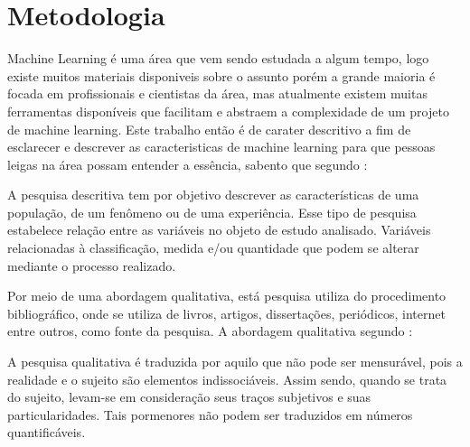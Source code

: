 \chapter{Metodologia}
\label{chap:metodologia}

Machine Learning é uma área que vem sendo estudada a algum tempo, logo existe muitos materiais disponiveis sobre o assunto
porém a grande maioria é focada em profissionais e cientistas da área, mas atualmente existem muitas ferramentas disponíveis
que facilitam e abstraem a complexidade de um projeto de machine learning. Este trabalho então é de carater descritivo a fim de esclarecer 
e descrever as caracteristicas de machine learning para que pessoas leigas na área possam entender a essência,     
sabento que segundo \cite{descritiva}:

\begin{citacao} 
 A pesquisa descritiva tem por objetivo descrever as características de uma população, de um fenômeno ou de uma experiência. 
 Esse tipo de pesquisa estabelece relação entre as variáveis no objeto de estudo analisado. 
 Variáveis relacionadas à classificação, medida e/ou quantidade que podem se alterar mediante o processo realizado.  
\end{citacao} 


Por meio de uma abordagem qualitativa, está pesquisa utiliza do procedimento bibliográfico, onde se utiliza de livros, 
artigos, dissertações, periódicos, internet entre outros, como fonte da pesquisa. A abordagem qualitativa segundo \cite{qualitativa} :

\begin{citacao}
A pesquisa qualitativa é traduzida por aquilo que não pode ser mensurável, pois a realidade e o sujeito são elementos indissociáveis. 
Assim sendo, quando se trata do sujeito, levam-se em consideração seus traços subjetivos e suas particularidades. 
Tais pormenores não podem ser traduzidos em números quantificáveis.
\end{citacao}